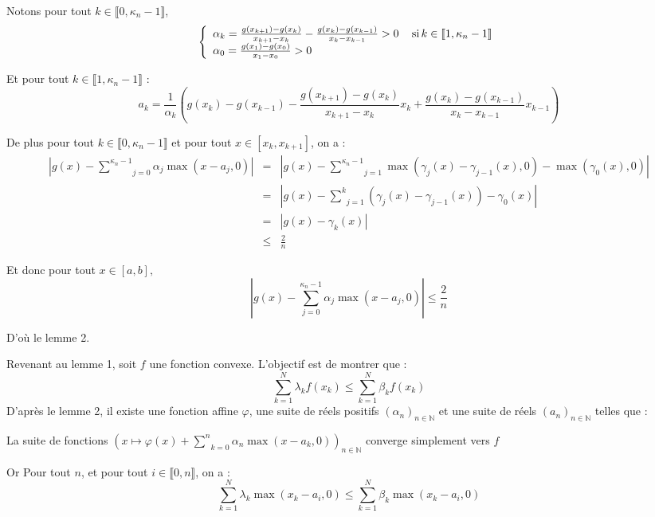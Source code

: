 Notons pour tout $k \in \llbracket 0, \kappa_n - 1 \rrbracket$,
\[ \left\{\begin{array}{l}
     \alpha_k = \frac{g (x_{k + 1}) - g (x_k)}{x_{k + 1} - x_k} - \frac{g
     (x_k) - g (x_{k - 1})}{x_k - x_{k - 1}} > 0 \quad \operatorname{si} k \in
     \llbracket 1, \kappa_n - 1 \rrbracket\\
     \alpha_0 = \frac{g \left( {x_1}  \right) - g (x_0)}{x_1 - x_0} > 0
   \end{array}\right. \]


Et pour tout $k \in \llbracket 1, \kappa_n - 1 \rrbracket$ :
\[ a_k = \frac{1}{\alpha_k} \left( g (x_k) - g (x_{k - 1}) - \frac{g (x_{k +
   1}) - g (x_k)}{x_{k + 1} - x_k} x_k + \frac{g (x_k) - g (x_{k - 1})}{x_k -
   x_{k - 1}} x_{k - 1} \right) \]


De plus pour tout $k \in \llbracket 0, \kappa_n - 1 \rrbracket$ et pour tout
$x \in [x_k, x_{k + 1}]$, on a :
\begin{eqnarray*}
  \left| g (x) - \underset{j = 0}{\overset{\kappa_n - 1}{\sum}} \alpha_j \max
  (x - a_j, 0) \right| & = & \left| g (x) - \underset{j = 1}{\overset{\kappa_n
  - 1}{\sum}} \max (\gamma_j (x) - \gamma_{j - 1} (x), 0) - \max (\gamma_0
  (x), 0) \right|\\
  & = & \left| g (x) - \underset{j = 1}{\overset{k}{\sum}} (\gamma_j (x) -
  \gamma_{j - 1} (x)) - \gamma_0 (x) \right|\\
  & = & | g (x) - \gamma_k (x) |\\
  & \leqslant & \frac{2}{n}
\end{eqnarray*}


Et donc pour tout $x \in [a, b],$
\[ \left| g (x) - \underset{j = 0}{\overset{\kappa_n - 1}{\sum}} \alpha_j \max
   (x - a_j, 0) \right| \leqslant \frac{2}{n} \]


D'o{\`u} le lemme 2.

Revenant au lemme 1, soit $f$ une fonction convexe. L'objectif est de montrer
que :
\[ \underset{k = 1}{\overset{N}{\sum}} \lambda_k f (x_k) \leqslant \underset{k
   = 1}{\overset{N}{\sum}} \beta_k f (x_k) \]
D'apr{\`e}s le lemme 2, il existe une fonction affine $\varphi$, une suite de
r{\'e}els positifs $(\alpha_n)_{n \in \mathbb{N}}$ et une suite de r{\'e}els
$(a_n)_{n \in \mathbb{N}}$ telles que :

La suite de fonctions $\left( x \longmapsto \varphi (x) + \underset{k =
0}{\overset{n}{\sum}} \alpha_n \max (x - a_k, 0) \right)_{n \in \mathbb{N}}$
converge simplement vers $f$

Or Pour tout $n$, et pour tout $i \in \llbracket 0, n \rrbracket$, on a :
\[ \underset{k = 1}{\overset{N}{\sum}} \lambda_k \max (x_k - a_i, 0) \leqslant
   \underset{k = 1}{\overset{N}{\sum}} \beta_k \max (x_k - a_i, 0) \]


